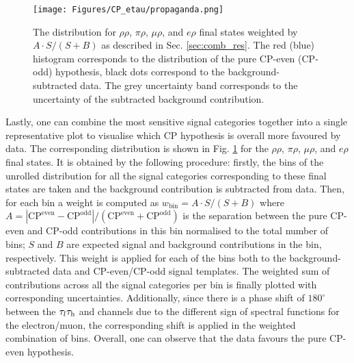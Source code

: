 \begin{figure}[h!]
    \centering
    \texttt{[image: Figures/CP\_etau/propaganda.png]}
    \caption{The \phicp distribution for $\rho\rho$, $\pi\rho$, $\mu\rho$, and $e\rho$ final states weighted by $A \cdot S/(S+B)$ as described in Sec. \ref{sec:comb_res}. The red (blue) histogram corresponds to the distribution of the pure CP-even (CP-odd) hypothesis, black dots correspond to the background-subtracted data. The grey uncertainty band corresponds to the uncertainty of the subtracted background contribution.}
    \label{fig:propaganda}
\end{figure}

Lastly, one can combine the most sensitive signal categories together into a single representative plot to visualise which CP hypothesis is overall more favoured by data. The corresponding distribution is shown in Fig. \ref{fig:propaganda} for the $\rho\rho$, $\pi\rho$, $\mu\rho$, and $e\rho$ final states. It is obtained by the following procedure: firstly, the bins of the unrolled \phicp distribution for all the signal categories corresponding to these final states are taken and the background contribution is subtracted from data. Then, for each bin a weight is computed as $w_\text{bin} = A \cdot S/(S+B)$ where $A = |\text{CP}^\text{even} - \text{CP}^\text{odd}| / (\text{CP}^\text{even} + \text{CP}^\text{odd})$ is the separation between the pure CP-even and CP-odd contributions in this bin normalised to the total number of bins; $S$ and $B$ are expected signal and background contributions in the bin, respectively. This weight is applied for each of the bins both to the background-subtracted data and CP-even/CP-odd signal templates. The weighted sum of contributions across all the signal categories per \phicp bin is finally plotted with corresponding uncertainties. Additionally, since there is a phase shift of $180^\circ$ between the $\tau_l\tau_\mathrm{h}$ and \tata channels due to the different sign of spectral functions for the electron/muon, the corresponding shift is applied in the weighted combination of bins. Overall, one can observe that the data favours the pure CP-even hypothesis. 